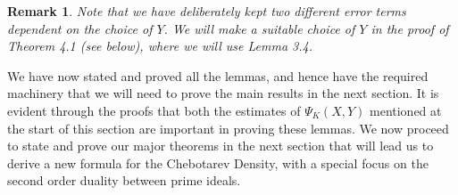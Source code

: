 \documentclass[12pt]{article}
\numberwithin{equation}{section}
\newtheorem{remark}[theorem]{Remark}
\numberwithin{equation}{section}
\begin{document}
\begin{remark}
    Note that we have deliberately kept two different error terms dependent on the choice of $Y$. We will make a suitable choice of $Y$ in the proof of \textit{Theorem 4.1} (see below), where we will use \textit{Lemma 3.4}.
\end{remark}
\noindent We have now stated and proved all the lemmas, and hence have the required machinery that we will need to prove the main results in the next section. It is evident through the proofs that both the estimates of $\Psi_K(X,Y)$ mentioned at the start of this section are important in proving these lemmas. We now proceed to state and prove our major theorems in the next section that will lead us to derive a new formula for the Chebotarev Density, with a special focus on the second order duality between prime ideals.
\end{document}
